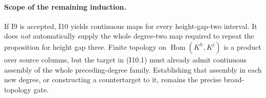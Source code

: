 \paragraph{Scope of the remaining induction.}
If I9 is accepted, I10 yields continuous maps for every height-gap-two
interval. It does \emph{not} automatically supply the whole degree-two
map required to repeat the proposition for height gap three. Finite
topology on $\operatorname{Hom}(K^h,K^j)$ is a product over source
columns, but the target in (I10.1) must already admit continuous
assembly of the whole preceding-degree family. Establishing that
assembly in each new degree, or constructing a countertarget to it,
remains the precise broad-topology gate.
